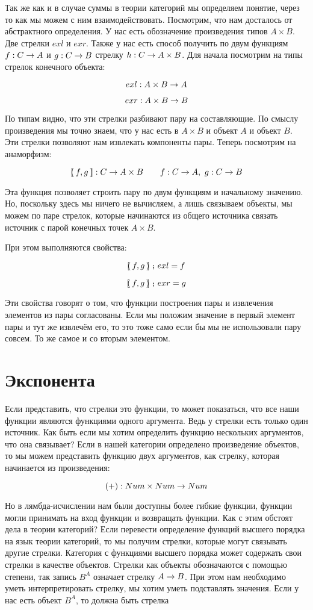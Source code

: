 Так же как и в случае суммы в теории категорий мы определяем понятие,
через то как мы можем с ним взаимодействовать. Посмотрим, что нам
досталось от абстрактного определения. У нас есть обозначение
произведения типов $A \times B$. Две стрелки $exl$ и $exr$. Также у нас
есть способ получить по двум функциям $f : C \rightarrow A$ и $g : C \rightarrow B$
стрелку $h : C \rightarrow A \times B$. Для начала посмотрим на типы стрелок
конечного объекта:

\[exl : A \times B \rightarrow A\]

\[exr : A \times B \rightarrow B\]

По типам видно, что эти стрелки разбивают пару на составляющие. По
смыслу произведения мы точно знаем, что у нас есть в $A\times B$ и
объект $A$ и объект $B$. Эти стрелки позволяют нам извлекать компоненты
пары. Теперь посмотрим на анаморфизм:

\[[\hspace{-2.4pt}(\,f,g\,)\hspace{-2.4pt}] : C \rightarrow A \times B \qquad f : C \rightarrow A,\ g : C \rightarrow B\]

Эта функция позволяет строить пару по двум функциям и начальному
значению. Но, поскольку здесь мы ничего не вычисляем, а лишь связываем
объекты, мы можем по паре стрелок, которые начинаются из общего
источника связать источник с парой конечных точек $A \times B$.

При этом выполняются свойства:

\[[\hspace{-2.4pt}(\,f,g\,)\hspace{-2.4pt}] \footnotesize\textbf{~;~}\normalsize exl = f\]

\[[\hspace{-2.4pt}(\,f,g\,)\hspace{-2.4pt}] \footnotesize\textbf{~;~}\normalsize exr = g\]

Эти свойства говорят о том, что функции построения пары и извлечения
элементов из пары согласованы. Если мы положим значение в первый элемент
пары и тут же извлечём его, то это тоже само если бы мы не использовали
пару совсем. То же самое и со вторым элементом.

\section{Экспонента}

Если представить, что стрелки это функции, то может показаться, что все
наши функции являются функциями одного аргумента. Ведь у стрелки есть
только один источник. Как быть если мы хотим определить функцию
нескольких аргументов, что она связывает? Если в нашей категории
определено произведение объектов, то мы можем представить функцию двух
аргументов, как стрелку, которая начинается из произведения:

\[(+) : Num \times Num \rightarrow Num\]

Но в лямбда-исчислении нам были доступны более гибкие функции, функции
могли принимать на вход функции и возвращать функции. Как с этим обстоят
дела в теории категорий? Если перевести определение функций высшего
порядка на язык теории категорий, то мы получим стрелки, которые могут
связывать другие стрелки. Категория с функциями высшего порядка может
содержать свои стрелки в качестве объектов. Стрелки как объекты
обозначаются с помощью степени, так запись $B^A$ означает стрелку
$A \rightarrow B$. При этом нам необходимо уметь интерпретировать стрелку, мы
хотим уметь подставлять значения. Если у нас есть объект $B^A$, то
должна быть стрелка

